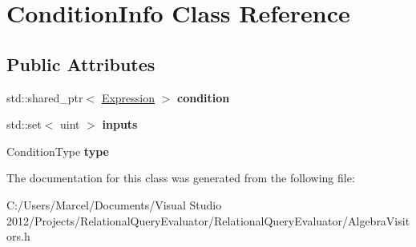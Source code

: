 \hypertarget{class_condition_info}{\section{Condition\+Info Class Reference}
\label{class_condition_info}
}
\subsection*{Public Attributes}
\begin{DoxyCompactItemize}
\item 
\hypertarget{class_condition_info_a57923bd70f56a79ca3ae8d09bb14f550}{std\+::shared\+\_\+ptr$<$ \hyperlink{class_expression}{Expression} $>$ {\bfseries condition}}\label{class_condition_info_a57923bd70f56a79ca3ae8d09bb14f550}

\item 
\hypertarget{class_condition_info_a7a637340f116e29ab09c76d83d3d3c69}{std\+::set$<$ uint $>$ {\bfseries inputs}}\label{class_condition_info_a7a637340f116e29ab09c76d83d3d3c69}

\item 
\hypertarget{class_condition_info_a8ceacc67eb6d52679a9541764fd8b7d6}{Condition\+Type {\bfseries type}}\label{class_condition_info_a8ceacc67eb6d52679a9541764fd8b7d6}

\end{DoxyCompactItemize}


The documentation for this class was generated from the following file\+:\begin{DoxyCompactItemize}
\item 
C\+:/\+Users/\+Marcel/\+Documents/\+Visual Studio 2012/\+Projects/\+Relational\+Query\+Evaluator/\+Relational\+Query\+Evaluator/Algebra\+Visitors.\+h\end{DoxyCompactItemize}
